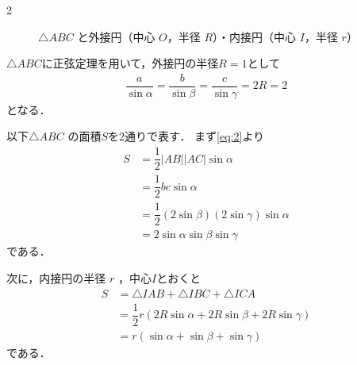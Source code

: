\documentclass[../../main.tex]{subfiles}
\begin{document}
\begin{multicols}{2}
\begin{figure}[H]
    \caption{$\triangle ABC$ と外接円（中心 $O$，半径 $R$）・内接円（中心 $I$，半径 $r$）}
    \label{2006-4:fig:1}
  \end{figure}

  $\triangle ABC$に正弦定理を用いて，外接円の半径$R=1$として
  \begin{align}
    \dfrac{a}{\sin \alpha} = \dfrac{b}{\sin \beta} = \dfrac{c}{\sin \gamma} = 2R = 2 \label{eq:2}
  \end{align}
  となる．

  以下$\triangle ABC$ の面積$S$を2通りで表す．
  まず\cref{eq:2}より
  \begin{align}
    S
    & = \dfrac{1}{2}|AB||AC|\sin\alpha                       \\
    & = \dfrac{1}{2} bc \sin\alpha                           \\
    & = \dfrac{1}{2} (2\sin\beta)(2\sin\gamma) \sin\alpha    \\
    & = 2 \sin\alpha\sin\beta\sin\gamma \label{eq:3}
  \end{align}
  である．

  次に，内接円の半径 $r$ ，中心$I$とおくと
  \begin{align}
    S
    & = \triangle IAB + \triangle IBC + \triangle ICA \\
    & =\dfrac{1}{2} r \left(2R \sin \alpha + 2R \sin \beta + 2R \sin \gamma\right) \\
    & =r \left(\sin \alpha + \sin \beta + \sin \gamma\right) \label{eq:4}
  \end{align}
  である．


\end{multicols}
\end{document}

